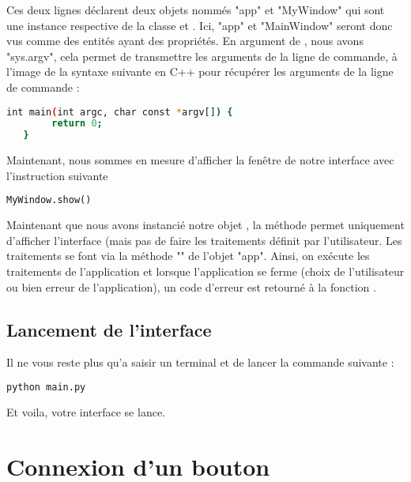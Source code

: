 Ces deux lignes déclarent deux objets nommés "app" et "MyWindow" qui sont une instance respective de la classe  et . \newline
Ici, "app" et "MainWindow" seront donc vus comme des entités ayant des propriétés.\newline
En argument de , nous avons "sys.argv", cela permet de transmettre les arguments de la ligne de commande, à l'image de la syntaxe suivante en C++ pour récupérer les arguments de la ligne de commande : \newline\newline
\begin{lstlisting}[language=bash]
   int main(int argc, char const *argv[]) {
        return 0;
   }
\end{lstlisting}


Maintenant, nous sommes en mesure  d'afficher la fenêtre de notre interface avec l'instruction suivante

\begin{lstlisting}[language=Python]
	MyWindow.show()
\end{lstlisting}

Maintenant que nous avons instancié notre objet , la méthode  permet uniquement d'afficher l'interface (mais pas de faire les traitements définit par l'utilisateur. \newline
Les traitements se font via la méthode "" de l'objet "app".
Ainsi, on exécute les traitements de l'application et lorsque l'application se ferme (choix de l'utilisateur ou bien erreur de l'application), un code d'erreur est retourné à la fonction .

\subsection{Lancement de l'interface}

Il ne vous reste plus qu'a saisir un terminal et de lancer la commande suivante : 
\begin{lstlisting}[language=bash]
	python main.py
\end{lstlisting}


Et voila, votre interface se lance.



\section{Connexion d'un bouton}\label{exemple_signal}

